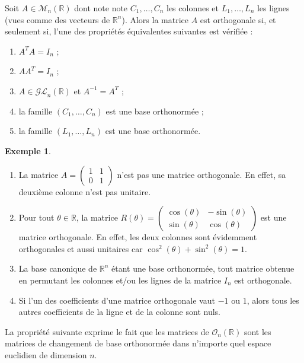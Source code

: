 \documentclass[french]{article}
\newcommand{\R}{\mathbb{R}}
\newcommand{\inv}{^{-1}}
\theoremstyle{plain}
\theoremstyle{definition}
\newtheorem*{ex}{Exemple}
\theoremstyle{remark}
\begin{document}
\begin{thm}
	Soit $A\in\mathcal{M}_n(\R)$ dont note note $C_1,\ldots,C_n$ les colonnes et $L_1,\ldots,L_n$ les lignes (vues comme des vecteurs de $\R^n$). Alors la matrice $A$ est orthogonale si, et seulement si, l'une des propriétés équivalentes suivantes est vérifiée :
	\begin{enumerate}[label=(\roman*)]
		\item $A^TA=I_n$ ;
		\item $AA^T=I_n$ ;
		\item $A\in\mathcal{GL}_n(\R)$ et $A\inv=A^T$ ;
		\item la famille $(C_1,\ldots,C_n)$ est une base orthonormée ;
		\item la famille $(L_1,\ldots,L_n)$ est une base orthonormée.
	\end{enumerate}
\end{thm}

\begin{ex}
	\begin{enumerate}
		\item La matrice $A=\displaystyle\begin{pmatrix}
			1&1\\
			0&1
		\end{pmatrix}$ n'est pas une matrice orthogonale. En effet, sa deuxième colonne n'est pas unitaire.
		\item Pour tout $\theta\in\R$, la matrice $R(\theta)=\displaystyle\begin{pmatrix}
			\cos(\theta)&-\sin(\theta)\\
			\sin(\theta)&\cos(\theta)
		\end{pmatrix}$ est une matrice orthogonale. En effet, les deux colonnes sont évidemment orthogonales et aussi unitaires car $\cos^2(\theta)+\sin^2(\theta)=1$.
		\item La base canonique de $\R^n$ étant une base orthonormée, tout matrice obtenue en permutant les colonnes et/ou les lignes de la matrice $I_n$ est orthogonale.
		\item Si l'un des coefficients d'une matrice orthogonale vaut $-1$ ou $1$, alors tous les autres coefficients de la ligne et de la colonne sont nuls.
	\end{enumerate}
\end{ex}

La propriété suivante exprime le fait que les matrices de $\mathcal{O}_n(\R)$ sont les matrices de changement de base orthonormée dans n'importe quel espace euclidien de dimension $n$.
\end{document}
